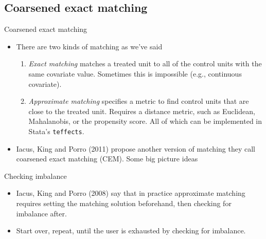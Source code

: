 \documentclass{beamer}
\begin{document}
\subsection{Coarsened exact matching}



\begin{frame}{Coarsened exact matching}
	
\begin{itemize}
\item There are two kinds of matching as we've said
	\begin{enumerate}
	\item \emph{Exact matching} matches a treated unit to all of the control units with the same covariate value. Sometimes this is impossible (e.g., continuous covariate). 
	\item \emph{Approximate matching} specifies a metric to find control units that are close to the treated unit. Requires a distance metric, such as Euclidean, Mahalanobis, or the propensity score.  All of which can be implemented in Stata's \texttt{teffects}.
	\end{enumerate}
\item 	Iacus, King and Porro (2011) propose another version of matching they call coarsened exact matching (CEM). Some big picture ideas
\end{itemize}
\end{frame}

\begin{frame}{Checking imbalance}

\begin{itemize}
\item Iacus, King and Porro (2008) say that in practice approximate matching requires setting the matching solution beforehand, then checking for imbalance after.  
\item Start over, repeat, until the user is exhausted by checking for imbalance.
\end{itemize}

\end{frame}
\end{document}

